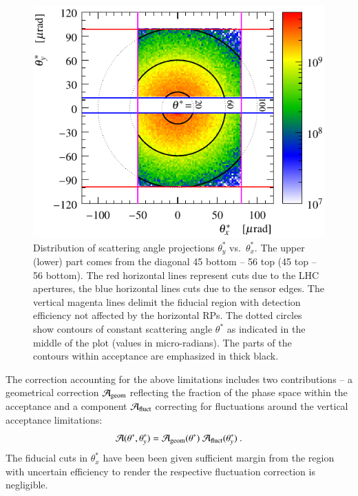 \begin{figure}
\begin{center}
\includegraphics{fig/acc_corr_phi_lab.pdf}
\caption{%
Distribution of scattering angle projections $\theta_y^*$ vs.~$\theta_x^*$. The upper (lower) part comes from the diagonal 45 bottom -- 56 top (45 top -- 56 bottom). The red horizontal lines represent cuts due to the LHC apertures, the blue horizontal lines cuts due to the sensor edges. The vertical magenta lines delimit the fiducial region with detection efficiency not affected by the horizontal RPs. The dotted circles show contours of constant scattering angle $\theta^*$ as indicated in the middle of the plot (values in micro-radians). The parts of the contours within acceptance are emphasized in thick black.
}
\label{fig:acc corr princ}
\end{center}
\end{figure}

The correction accounting for the above limitations includes two contributions -- a geometrical correction ${\cal A}_{\rm geom}$ reflecting the fraction of the phase space within the acceptance and a component ${\cal A}_{\rm fluct}$ correcting for fluctuations around the vertical acceptance limitations:
\begin{equation}
{\cal A}(\theta^*, \theta_y^*) = {\cal A}_{\rm geom}(\theta^*)\ {\cal A}_{\rm fluct}(\theta_y^*)\ .
\end{equation}
The fiducial cuts in $\theta_x^*$ have been been given sufficient margin from the region with uncertain efficiency to render the respective fluctuation correction is negligible.

